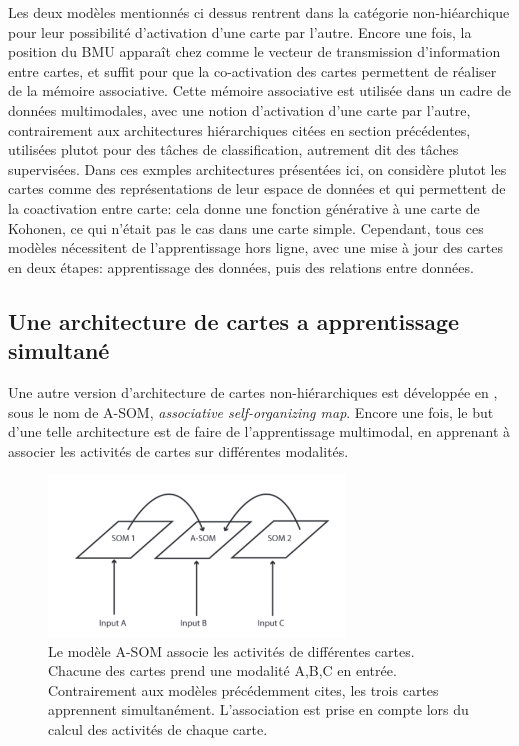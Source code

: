 \documentclass[../main]{subfiles}
\begin{document}
Les deux modèles mentionnés ci dessus rentrent dans la catégorie non-hiéarchique pour leur possibilité d'activation d'une carte par l'autre. Encore une fois, la position du BMU apparaît chez \cite{dominey13} comme le vecteur de transmission d'information  entre cartes, et suffit pour que la co-activation des cartes permettent de réaliser de la mémoire associative.
Cette mémoire associative est utilisée dans un cadre de données multimodales, avec une notion d'activation d'une carte par l'autre, contrairement aux architectures hiérarchiques citées en section précédentes, utilisées plutot pour des tâches de classification, autrement dit des tâches supervisées.
Dans ces exmples architectures présentées ici, on considère plutot les cartes comme des représentations de leur espace de données et qui permettent de la coactivation entre carte: cela donne une fonction générative à une carte de Kohonen, ce qui n'était pas le cas dans une carte simple.
Cependant, tous ces modèles nécessitent de l'apprentissage hors ligne, avec une mise à jour des cartes en deux étapes: apprentissage des données, puis des relations entre données.

\subsection{Une architecture de cartes a apprentissage simultané}
Une autre version d'architecture de cartes non-hiérarchiques est développée en \cite{johnsson_associating_2008}, sous le nom de A-SOM, \emph{associative self-organizing map}. Encore une fois, le but d'une telle architecture est de faire de l'apprentissage multimodal, en apprenant à associer les activités de cartes sur différentes modalités. 
\begin{figure}
    \centering\includegraphics[width=0.7\textwidth]{A-SOM.pdf}
    \caption{Le modèle A-SOM \cite{johnsson_associating_2008} associe les activités de différentes cartes. Chacune des cartes prend une modalité A,B,C en entrée. Contrairement aux modèles précédemment cites, les trois cartes apprennent simultanément. L'association est prise en compte lors du calcul des activités de chaque carte.\label{fig:asom}}
\end{figure}
\end{document}
